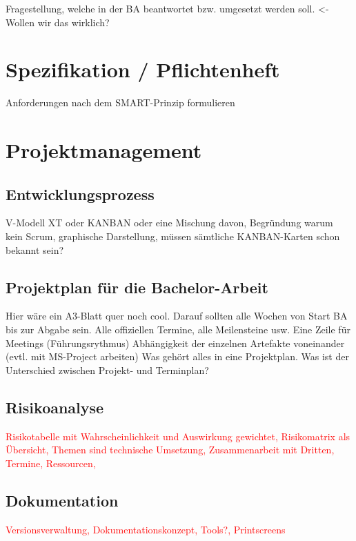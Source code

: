 \documentclass[a4paper,ngerman, 11pt]{report}
\newcommand\Diskussionspunkt[1]{\textcolor{red}{#1}}
\begin{document}
Fragestellung, welche in der BA beantwortet bzw. umgesetzt werden soll. <- Wollen wir das wirklich?


\chapter{Spezifikation / Pflichtenheft}
Anforderungen nach dem SMART-Prinzip formulieren
   


\chapter{Projektmanagement}
\section{Entwicklungsprozess}
V-Modell XT oder KANBAN oder eine Mischung davon, Begründung warum kein Scrum, graphische Darstellung, müssen sämtliche KANBAN-Karten schon bekannt sein?


\section{Projektplan für die Bachelor-Arbeit}
Hier wäre ein A3-Blatt quer noch cool. Darauf sollten alle Wochen von Start BA bis zur Abgabe sein.
Alle offiziellen Termine, alle Meilensteine usw.
Eine Zeile für Meetings (Führungsrythmus)
Abhängigkeit der einzelnen Artefakte voneinander (evtl. mit MS-Project arbeiten)
Was gehört alles in eine Projektplan. Was ist der Unterschied zwischen Projekt- und Terminplan?

\section{Risikoanalyse}
   
\Diskussionspunkt{Risikotabelle mit Wahrscheinlichkeit und Auswirkung gewichtet, Risikomatrix als Übersicht, Themen sind technische Umsetzung, Zusammenarbeit mit Dritten, Termine, Ressourcen, }



\section{Dokumentation}
\Diskussionspunkt{Versionsverwaltung, Dokumentationskonzept, Tools?, Printscreens}
\end{document}
